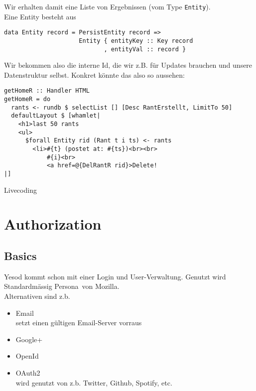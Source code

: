 \documentclass{beamer}
\begin{document}
\begin{frame}[fragile]
Wir erhalten damit eine Liste von Ergebnissen (vom Type \texttt{Entity}).\\\pause
Eine Entity besteht aus
\begin{verbatim}
data Entity record = PersistEntity record =>
                     Entity { entityKey :: Key record
                            , entityVal :: record }
\end{verbatim}
\pause
Wir bekommen also die interne Id, die wir z.B. für Updates brauchen und unsere Datenstruktur selbst. Konkret könnte das also so aussehen:
\begin{verbatim}
getHomeR :: Handler HTML
getHomeR = do
  rants <- rundb $ selectList [] [Desc RantErstellt, LimitTo 50]
  defaultLayout $ [whamlet|
    <h1>last 50 rants
    <ul>
      $forall Entity rid (Rant t i ts) <- rants
        <li>#{t} (postet at: #{ts})<br><br>
            #{i}<br>
            <a href=@{DelRantR rid}>Delete!
|]
\end{verbatim}
\end{frame}

\begin{frame}
Livecoding
\end{frame}

\section{Authorization}

\subsection{Basics}

\begin{frame}[fragile]
Yesod kommt schon mit einer Login und User-Verwaltung. Genutzt wird Standardmässig \glqq Persona\grqq \ von Mozilla.\\\pause
Alternativen sind z.b.
\begin{itemize}
 \item Email\\
       setzt einen gültigen Email-Server vorraus
 \pause
 \item Google+
 \pause
 \item OpenId
 \pause
 \item OAuth2\\
       wird genutzt von z.b. Twitter, Github, Spotify, etc.
\end{itemize}
\end{frame}
\end{document}
